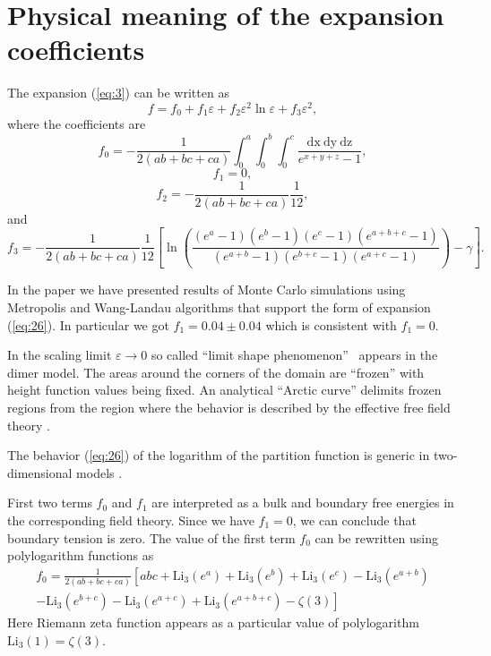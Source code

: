 \documentclass{article}
\newcommand{\Li}{\mathrm{Li}}
\newcommand{\dx}{\mathrm{dx}~}
\newcommand{\dy}{\mathrm{dy}~}
\newcommand{\dz}{\mathrm{dz}}
\begin{document}
\section{Physical meaning of the expansion coefficients}
\label{sec:accur-expans-phys}

The expansion  (\ref{eq:3}) can be written as
\begin{equation}
  \label{eq:26}
  f=f_{0}+f_{1}\varepsilon +f_{2}\varepsilon^{2}\ln\varepsilon+ f_{3}\varepsilon^{2},
\end{equation}
where the coefficients are
\begin{equation}
  \label{eq:27}
  f_{0}=-\frac{1}{2(ab+bc+ca)}\int_{0}^{a} \int_{0}^{b}\int_{0}^{c}\frac{\dx \dy \dz}{e^{x+y+z}-1},
\end{equation}
\begin{equation}
  \label{eq:28}
  f_{1}=0,
\end{equation}
\begin{equation}
  \label{eq:30}
  f_{2}=-\frac{1}{2(ab+bc+ca)}\frac{1}{12},
\end{equation}
and
\begin{equation}
  \label{eq:29}
  f_{3}=-\frac{1}{2(ab+bc+ca)}\frac{1}{12}\left[\ln\left(\frac{(e^{a}-1)(e^{b}-1)(e^{c}-1)(e^{a+b+c}-1)}{(e^{a+b}-1)(e^{b+c}-1)(e^{a+c}-1)}\right)-
    \gamma\right].
\end{equation}

In the paper \cite{1742-6596-1135-1-012024} we have presented results of Monte Carlo simulations using
Metropolis and Wang-Landau algorithms that support the form of expansion (\ref{eq:26}). In
particular we got $f_{1}=0.04\pm 0.04$ which is consistent with $f_{1}=0$. 

In the scaling limit $\varepsilon\to 0$ so called ``limit shape phenomenon''~\cite{1998math......1068J,cohn1998shape}
appears in the dimer model. The areas around the corners of the domain are ``frozen'' with height
function values being fixed. An analytical ``Arctic curve'' delimits frozen regions from the region
where the behavior is described by the effective free field theory
\cite{kenyon2009lectures,kenyon2008height,kenyon2006dimers}.

The behavior (\ref{eq:26}) of the logarithm of the partition function is generic in two-dimensional
models \cite{cardy1988finite}.

First two terms $f_{0}$ and $f_{1}$ are interpreted as a bulk and
boundary free energies in the corresponding field theory. Since we have $f_{1}=0$, we can conclude
that boundary tension is zero.
The value of the first term $f_{0}$ can be rewritten using polylogarithm functions as
\begin{multline}
  \label{eq:34}
  f_{0}=\frac{1}{2(ab+bc+ca)}\left[abc + \Li_{3}(e^{a})+\Li_{3}(e^{b})+\Li_{3}(e^{c})-
    \Li_{3}(e^{a+b})\right.\\
  \left.-\Li_{3}(e^{b+c})-    \Li_{3}(e^{a+c})+    \Li_{3}(e^{a+b+c})-\zeta(3)\right]
\end{multline}
Here Riemann zeta function appears as a particular value of polylogarithm $\Li_{3}(1)=\zeta(3)$. 
\end{document}
